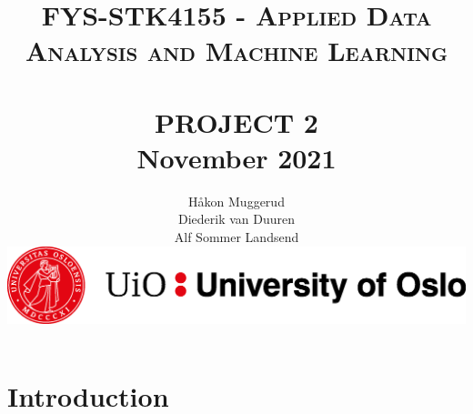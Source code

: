 \documentclass[12pt,a4paper]{article}
\title{	\normalsize \textsc{FYS-STK4155 - Applied Data Analysis and Machine Learning} 	%
		 	\\[2.0cm]								%
			\HRule{2pt} \\	[0.5cm]				%
			\LARGE \textbf{\uppercase{Project 2}}	%
			\HRule{2pt} \\ [0.5cm]		%
         \normalsize November 2021 \\
		}
\author{
		Håkon Muggerud\\
		Diederik van Duuren \\
		Alf Sommer Landsend
      \begin{center}       
         \includegraphics[width=\textwidth]{UiO.png}
      \end{center}
}
\makeatletter
\def\printtitle{%
   {\centering \@title\par}}
\def\printauthor{%
   {\centering \large \@author}}
\makeatother
\begin{document}
\thispagestyle{empty}		%

\printtitle					%
  	\vfill
\printauthor				%
\newpage

\tableofcontents
\thispagestyle{empty}
\newpage

\section{Introduction}
\end{document}
